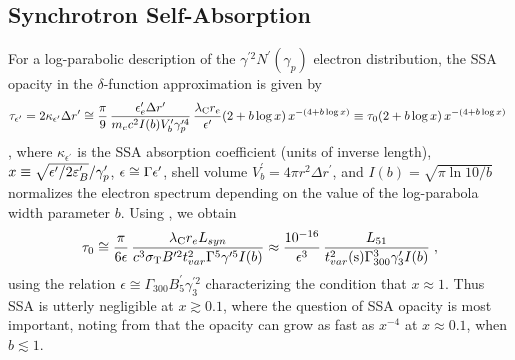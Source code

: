 \subsection{Synchrotron Self-Absorption}
For a log-parabolic description of the $\gamma^{\prime 2} N^\prime
(\gamma_p)$ electron distribution, the SSA opacity in the
$\delta$-function approximation is given by
\begin{equation}
  \tau_{\epsilon^\prime} = 2\kappa_{\epsilon^\prime} \Delta r^\prime \cong {\pi \over 9}\,{\epsilon_e^\prime \Delta r^\prime\over m_ec^2 I(b) V_b^\prime \gamma_p^{\prime 4}}\, {\lambda_{\rm C} r_e\over \epsilon^\prime} (2+ b\log x)\,x^{-(4+b\log x)}
  \equiv \tau_0 (2+ b\log x)\,x^{-(4+b\log x)}\;
\label{tauep}
\end{equation}
\cite{2009herb.book.....D,2013arXiv1304.6680D}, where
$\kappa_{\epsilon^\prime}$ is the SSA absorption coefficient (units of
inverse length), $x \equiv
\sqrt{\epsilon^\prime/2\varepsilon_B^\prime}/\gamma_p^\prime$, $\epsilon \cong \Gamma\epsilon^\prime$,
shell volume $V_b^\prime = 4\pi r^2 \Delta r^\prime$, and $I(b) =
\sqrt{\pi \ln 10/b}$ normalizes the electron spectrum depending on the
value of the log-parabola width parameter $b$.  Using , we
obtain
\begin{equation}
\tau_{0} \cong {\pi \over 6\epsilon}\,{ {\lambda_{\rm C} r_e L_{syn} \over c^3 \sigma_{\rm T} B^{\prime 2} t_{var}^2 \Gamma^5 \gamma^{\prime 5} I(b)}}
\approx {10^{-16} \over \epsilon^3 }\,{ { L_{51} \over  t_{var}^2({\rm s}) \Gamma_{300}^3 \gamma_3^\prime I(b)}}\;, 
\label{eq:tau0}
\end{equation}
using the relation $\epsilon \cong \Gamma_{300} B^\prime_5
\gamma^{\prime 2}_3$ characterizing the condition that $x \approx 1$.
Thus SSA is utterly negligible at $x \gtrsim 0.1$, where the question
of SSA opacity is most important, noting from  that the
opacity can grow as fast as $x^{-4}$ at $x\approx 0.1$, when
$b\lesssim 1$.

